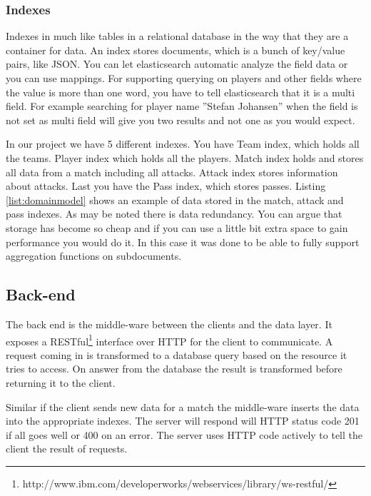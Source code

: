 
\subsubsection{Indexes}

Indexes in much like tables in a relational database in the way that they are a container for data. An index stores documents, which is a bunch of key/value pairs, like JSON. You can let elasticsearch automatic analyze the field data or you can use mappings. For supporting querying on players and other fields where the value is more than one word, you have to tell elasticsearch that it is a multi field. For example searching for player name ''Stefan Johansen'' when the field is not set as multi field will give you two results and not one as you would expect.

In our project we have 5 different indexes. You have Team index, which holds all the teams. Player index which holds all the players. Match index holds and stores all data from a match including all attacks. Attack index stores information about attacks. Last you have the Pass index, which stores passes. Listing \ref{list:domainmodel} shows an example of data stored in the match, attack and pass indexes. 
As may be noted there is data redundancy. You can argue that storage has become so cheap and if you can use a little bit extra space to gain performance you would do it. In this case it was done to be able to fully support aggregation functions on subdocuments.

\subsection{Back-end}

The back end is the middle-ware between the clients and the data layer. It exposes a RESTful\footnote{http://www.ibm.com/developerworks/webservices/library/ws-restful/} interface over HTTP for the client to communicate. A request coming in is transformed to a database query based on the resource it tries to access. On answer from the database the result is transformed before returning it to the client. 

Similar if the client sends new data for a match the middle-ware inserts the data into the appropriate indexes. The server will respond will HTTP status code 201 if all goes well or 400 on an error. The server uses HTTP code actively to tell the client the result of requests.

